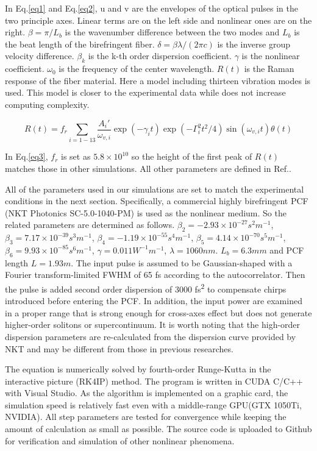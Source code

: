\documentclass{osa-article}
\begin{document}
In Eq.\ref{eq1} and Eq.\ref{eq2}, u and v are the envelopes of the optical pulses in the two principle axes. Linear terms are on the left side and nonlinear ones are on the right. $\beta=\pi/L_b$ is the wavenumber difference between the two modes and $L_b$ is the beat length of the birefringent fiber. $\delta=\beta \lambda/(2\pi c)$ is the inverse group velocity difference. $\beta_k$ is the k-th order dispersion coefficient. $\gamma$ is the nonlinear coefficient. $\omega_0$ is the frequency of the center wavelength. $R(t)$ is the Raman response of the fiber material. Here a model including thirteen vibration modes is used\cite{Hollenbeck2002}. This model is closer to the experimental data while does not increase computing complexity.

\begin{equation}
    R(t)=f_r\sum_{i=1-13}\frac{A_i '}{\omega_{v,i}}\exp(-\gamma_i t)\exp(-\Gamma_i^2t^2/4)\sin(\omega_{v,i}t)\theta(t)
    \label{eq3}
\end{equation}

In Eq.\ref{eq3}, $f_r$ is set as $5.8\times 10^{10}$ so the height of the first peak of $R(t)$ matches those in other simulations\cite{agrawal_nonlinear_2013}. All other parameters are defined in Ref.\cite{Hollenbeck2002}.

All of the parameters used in our simulations are set to match the experimental conditions in the next section. Specifically, a commercial highly birefringent PCF (NKT Photonics SC-5.0-1040-PM) is used as the nonlinear medium. So the related parameters are determined as follows. $\beta_2=-2.93\times 10^{-27} s^2m^{-1}$, $\beta_3=7.17\times 10^{-39} s^3m^{-1}$, $\beta_4=-1.19\times 10^{-55} s^4m^{-1}$, $\beta_5=4.14\times 10^{-70} s^5m^{-1}$, $\beta_6=9.93\times 10^{-85} s^6m^{-1}$, $\gamma=0.011 W^{-1}m^{-1}$, $\lambda=1060 nm$. $L_b=6.3 mm$ and PCF length $ L= 1.93m$. The input pulse is assumed to be Gaussian-shaped with a Fourier transform-limited FWHM of 65 fs according to the autocorrelator. Then the pulse is added second order dispersion of 3000 fs\textsuperscript{2} to compensate chirps introduced before entering the PCF. In addition, the input power are examined in a proper range that is strong enough for cross-axes effect but does not generate higher-order solitons or supercontinuum. It is worth noting that the high-order dispersion parameters are re-calculated from the dispersion curve provided by NKT and may be different from those in previous researches\cite{chen_dual-soliton_2016}.

The equation is numerically solved by fourth-order Runge-Kutta in the interactive picture (RK4IP)\cite{Hult2007} method. The program is written in CUDA C/C++ with Visual Studio. As the algorithm is implemented on a graphic card, the simulation speed is relatively fast even with a middle-range GPU(GTX 1050Ti, NVIDIA). All step parameters are tested for convergence while keeping the amount of calculation as small as possible. The source code is uploaded to Github for verification and simulation of other nonlinear phenomena.
\end{document}
